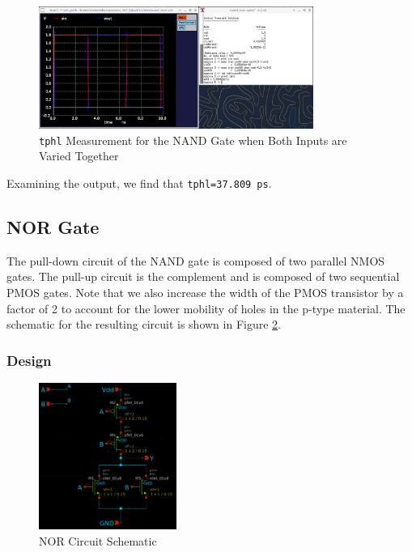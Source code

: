 \documentclass[fleqn]{article}
\begin{document}
	\begin{figure}[H]
		\centerline{\includegraphics[width=0.8\textwidth]{nand_delay_sweep_va_vb.png}}
		\caption{\texttt{tphl} Measurement for the NAND Gate when Both Inputs are Varied Together}
		\label{fig::nand_delay_sweep_va_vb}
	\end{figure}
	
	Examining the output, we find that \texttt{tphl=37.809 ps}.
	
	\subsection{NOR Gate}
	
	The pull-down circuit of the NAND gate is composed of two parallel NMOS gates. The pull-up circuit is the complement and is composed of two sequential PMOS gates. Note that we also increase the width of the PMOS transistor by a factor of 2 to account for the lower mobility of holes in the p-type material. The schematic for the resulting circuit is shown in Figure \ref{fig::nor_schematic}.
	
	\subsubsection{Design}
	
	\begin{figure}[H]
		\centerline{\includegraphics[width=0.4\textwidth]{nor_schematic.png}}
		\caption{NOR Circuit Schematic}
		\label{fig::nor_schematic}
	\end{figure}
	
\end{document}
